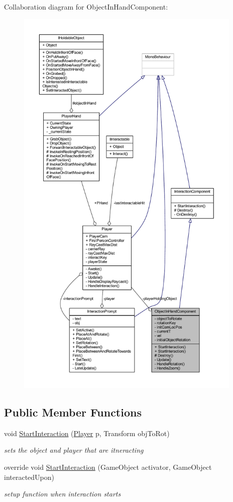 Collaboration diagram for Object\+In\+Hand\+Component\+:
\nopagebreak
\begin{figure}[H]
\begin{center}
\leavevmode
\includegraphics[height=550pt]{class_object_in_hand_component__coll__graph}
\end{center}
\end{figure}
\subsection*{Public Member Functions}
\begin{DoxyCompactItemize}
\item 
void \mbox{\hyperlink{class_object_in_hand_component_a3399bcee7bffea9b599f1dd8d6e2a93c}{Start\+Interaction}} (\mbox{\hyperlink{class_player}{Player}} p, Transform obj\+To\+Rot)
\begin{DoxyCompactList}\small\item\em sets the object and player that are itneracting \end{DoxyCompactList}\item 
override void \mbox{\hyperlink{class_object_in_hand_component_aed115a3a0f70c23370cab4428454025c}{Start\+Interaction}} (Game\+Object activator, Game\+Object interacted\+Upon)
\begin{DoxyCompactList}\small\item\em setup function when interaction starts \end{DoxyCompactList}\end{DoxyCompactItemize}
